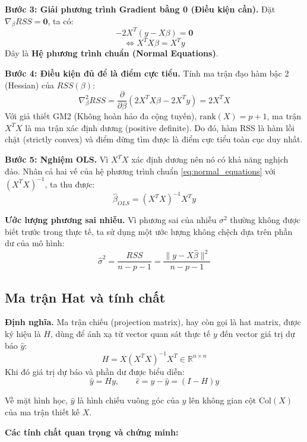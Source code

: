 \documentclass[a4paper]{article}
\begin{document}
\textbf{Bước 3: Giải phương trình Gradient bằng 0 (Điều kiện cần).}
Đặt $\nabla_{\beta}RSS = \mathbf{0}$, ta có:
$$-2X^T(y - X\beta) = \mathbf{0}$$
\begin{equation}\label{eq:normal_equations}
\iff X^TX\beta = X^Ty
\end{equation}
Đây là \textbf{Hệ phương trình chuẩn (Normal Equations)}.

\textbf{Bước 4: Điều kiện đủ để là điểm cực tiểu.}
Tính ma trận đạo hàm bậc 2 (Hessian) của $RSS(\beta)$:
$$\nabla^2_{\beta}RSS = \frac{\partial}{\partial \beta}(2X^TX\beta - 2X^Ty) = 2X^TX$$
Với giả thiết GM2 (Không hoàn hảo đa cộng tuyến), $\text{rank}(X) = p+1$, ma trận $X^TX$ là ma trận xác định dương (positive definite). Do đó, hàm RSS là hàm lồi chặt (strictly convex) và điểm dừng tìm được là điểm cực tiểu toàn cục duy nhất.

\textbf{Bước 5: Nghiệm OLS.}
Vì $X^TX$ xác định dương nên nó có khả năng nghịch đảo. Nhân cả hai vế của hệ phương trình chuẩn \eqref{eq:normal_equations} với $(X^TX)^{-1}$, ta thu được:
\begin{equation}
\hat{\beta}_{OLS} = (X^TX)^{-1}X^Ty
\end{equation}

\textbf{Ước lượng phương sai nhiễu.}
Vì phương sai của nhiễu $\sigma^2$ thường không được biết trước trong thực tế, ta sử dụng một ước lượng không chệch dựa trên phần dư của mô hình:
\begin{equation}
\hat{\sigma}^2 = \frac{RSS}{n - p - 1} = \frac{\lVert y - X\hat{\beta} \rVert^2}{n - p - 1}
\end{equation}

\subsection{Ma trận Hat và tính chất}

\textbf{Định nghĩa.} Ma trận chiếu (projection matrix), hay còn gọi là hat matrix, được ký hiệu là $H$, dùng để ánh xạ từ vector quan sát thực tế $y$ đến vector giá trị dự báo $\hat{y}$:
\begin{equation}
H = X(X^TX)^{-1}X^T \in \mathbb{R}^{n \times n}
\end{equation}
Khi đó giá trị dự báo và phần dư được biểu diễn:
$$\hat{y} = Hy, \qquad \hat{\epsilon} = y - \hat{y} = (I - H)y$$

Về mặt hình học, $\hat{y}$ là hình chiếu vuông góc của $y$ lên không gian cột $\text{Col}(X)$ của ma trận thiết kế $X$.

\textbf{Các tính chất quan trọng và chứng minh:}
\end{document}
